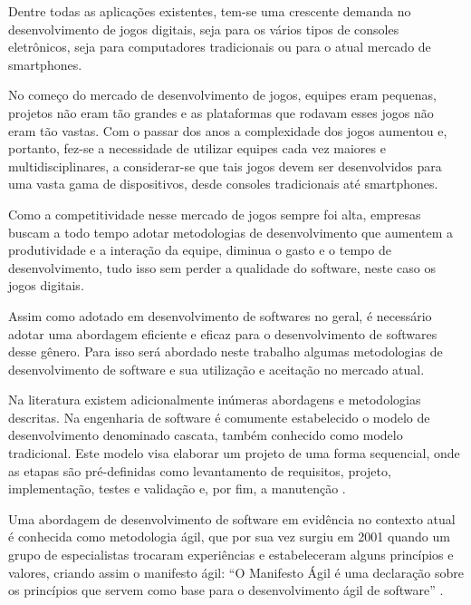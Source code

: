 \documentclass[quali]{ppgccufscar}
\begin{document}
Dentre todas as aplicações existentes, tem-se uma crescente demanda no desenvolvimento de jogos digitais, seja para os vários tipos de consoles eletrônicos, seja para computadores tradicionais ou para o atual mercado de smartphones.

No começo do mercado de desenvolvimento de jogos, equipes eram pequenas, projetos não eram tão grandes e as plataformas que rodavam esses jogos não eram tão vastas. Com o passar dos anos a complexidade dos jogos aumentou e, portanto, fez-se a necessidade de utilizar equipes cada vez maiores e multidisciplinares, a considerar-se que tais jogos devem ser desenvolvidos para uma vasta gama de dispositivos, desde consoles tradicionais até smartphones.

Como a competitividade nesse mercado de jogos sempre foi alta, empresas buscam a todo tempo adotar metodologias de desenvolvimento que aumentem a produtividade e a interação da equipe, diminua o gasto e o tempo de desenvolvimento, tudo isso sem perder a qualidade do software, neste caso os jogos digitais.

Assim como adotado em desenvolvimento de softwares no geral, é necessário adotar uma abordagem eficiente e eficaz para o desenvolvimento de softwares desse gênero. Para isso será abordado neste trabalho algumas metodologias de desenvolvimento de software e sua utilização e aceitação no mercado atual.

Na literatura existem adicionalmente inúmeras abordagens e metodologias descritas. Na engenharia de software é comumente estabelecido o modelo de desenvolvimento denominado cascata, também conhecido como modelo tradicional. Este modelo visa elaborar um projeto de uma forma sequencial, onde as etapas são pré-definidas como levantamento de requisitos, projeto, implementação, testes e validação e, por fim, a manutenção \cite{sommerville2010}.

Uma abordagem de desenvolvimento de software em evidência no contexto atual é conhecida como metodologia ágil, que por sua vez surgiu em 2001 quando um grupo de especialistas trocaram experiências e estabeleceram alguns princípios e valores, criando assim o manifesto ágil: “O Manifesto Ágil é uma declaração sobre os princípios que servem como base para o desenvolvimento ágil de software” \cite{beck2001}.
\end{document}
